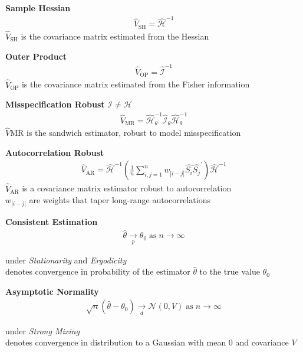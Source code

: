 \documentclass[8pt,aspectratio=169]{beamer}
\begin{document}
\begin{frame}{}
\textbf{Sample Hessian}
\begin{align}
    \widehat V_\text{SH} = \widehat{\mathcal{H}}^{-1}
\end{align}
$\widehat V_\text{SH}$ is the covariance matrix estimated from the Hessian
\vfill

\textbf{Outer Product}
\begin{align}
    \widehat V_\text{OP} = \widehat{\mathscr{I}}^{-1}
\end{align}
$\widehat V_\text{OP}$ is the covariance matrix estimated from the Fisher information\\
\vfill

\textbf{Misspecification Robust} $\mathscr{I} \ne \mathcal{H}$\\
\begin{align}
    \widehat V_\text{MR} = \widehat{\mathcal{H}}_\theta^{-1} \widehat{\mathscr{I}}_\theta \widehat{\mathcal{H}}_\theta^{-1}
\end{align}
$\widehat V\text{MR}$ is the sandwich estimator, robust to model misspecification

\vfill
\textbf{Autocorrelation Robust}\\
\begin{align}
    \widehat V_\text{AR} = \widehat{\mathcal{H}}^{-1} \left(\frac{1}{n} \sum_{i,j=1}^n w_{|i-j|} \hat{S_i} \hat{S_j}^\prime\right) \widehat{\mathcal{H}}^{-1}
\end{align}
$\widehat V_\text{AR}$ is a covariance matrix estimator robust to autocorrelation\\
$w_{|i-j|}$ are weights that taper long-range autocorrelations

\end{frame}

\begin{frame}{}

\textbf{Consistent Estimation} \citep[Theorem~10.8]{hansen_probability_2022}
\begin{align}
    \hat{\theta} \underset{p}{\to} \theta_0\;\text{as}\;n\to\infty
\end{align}

under \emph{Stationarity} and \emph{Ergodicity} \citep[Theorem~14.9]{hansen_econometrics_2022}\\
denotes convergence in probability of the estimator $\hat\theta$ to the true value $\theta_0$

\vfill
\textbf{Asymptotic Normality} \citep[Theorem~10.16]{hansen_probability_2022}
\begin{align}
    \sqrt{n}(\hat{\theta} - \theta_0) \underset{d}{\to} \mathcal{N}(0, V) \;\text{as}\;n\to\infty
\end{align}

under \emph{Strong Mixing} \citep[Theorem~14.15]{hansen_econometrics_2022}\\
denotes convergence in distribution to a Gaussian with mean 0 and covariance $V$
\end{frame}
\end{document}

